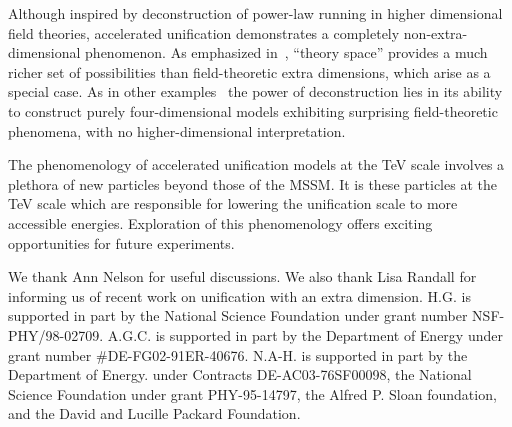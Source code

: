 \documentclass[a4paper,prl,twocolumn]{revtex4}
\begin{document}
Although inspired by deconstruction of power-law running in higher
dimensional field theories, accelerated unification demonstrates a
completely non-extra-dimensional phenomenon.  As emphasized
in~\cite{Arkani-Hamed:2001ca}, ``theory space'' provides a much richer set
of possibilities than field-theoretic extra dimensions, which arise as
a special case. As in other
examples~\cite{Arkani-Hamed:2001nc,Cheng:2001nh,Csaki:2001em,Cheng:2001an,Csaki:2001qm,Cheng:2001qp}
the power of deconstruction lies in its ability to construct purely
four-dimensional models exhibiting surprising field-theoretic phenomena,
with no higher-dimensional interpretation.

The phenomenology of accelerated unification models at the TeV scale
involves a plethora of new particles beyond those of the MSSM.  It is
these particles at the TeV scale which are responsible for lowering
the unification scale to more accessible energies. Exploration of this
phenomenology offers exciting opportunities for future experiments.





\bigskip We thank Ann Nelson for useful discussions.  We also thank
Lisa Randall for informing us of recent work on 
unification with an extra dimension.  H.G. is supported in part
by the National Science Foundation under grant number
NSF-PHY/98-02709. A.G.C. is supported in part by the Department of
Energy under grant number \#DE-FG02-91ER-40676.  N.A-H.  is supported
in part by the Department of Energy. under Contracts
DE-AC03-76SF00098, the National Science Foundation under grant
PHY-95-14797, the Alfred P. Sloan foundation, and the David and
Lucille Packard Foundation.

%
%
\end{document}
